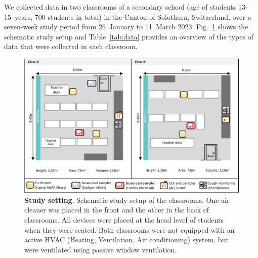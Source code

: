 \documentclass[fleqn,11pt]{wlscirep}
\begin{document}
\noindent We collected data in two classrooms of a secondary school (age of students 13-15~years, 700 students in total) in the Canton of Solothurn, Switzerland, over a seven-week study period from 26~January to 11~March 2023. Fig.~\ref{fig:study-setup} shows the schematic study setup and Table~\ref{tab:data} provides an overview of the types of data that were collected in each classroom. 

\begin{figure}[!htpb]
    \centering
    \includegraphics{../study_setting.pdf}
    \caption{\textbf{Study setting}. Schematic study setup of the classrooms. One air cleaner was placed in the front and the other in the back of classrooms. All devices were placed at the head level of students when they were seated. Both classrooms were not equipped with an active HVAC (Heating, Ventilation, Air conditioning) system, but were ventilated using passive window ventilation. }
    \label{fig:study-setup}
\end{figure}
\end{document}
